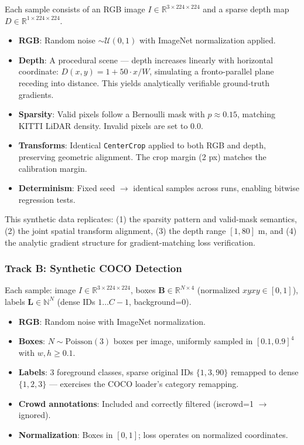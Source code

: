 \documentclass[10pt,conference]{IEEEtran}
\begin{document}
Each sample consists of an RGB image $I \in \mathbb{R}^{3 \times 224 \times 224}$ and a sparse depth map $D \in \mathbb{R}^{1 \times 224 \times 224}$.

\begin{itemize}
    \item \textbf{RGB}: Random noise $\sim \mathcal{U}(0,1)$ with ImageNet normalization applied.
    \item \textbf{Depth}: A procedural scene — depth increases linearly with horizontal coordinate: $D(x,y) = 1 + 50 \cdot x / W$, simulating a fronto-parallel plane receding into distance. This yields analytically verifiable ground-truth gradients.
    \item \textbf{Sparsity}: Valid pixels follow a Bernoulli mask with $p \approx 0.15$, matching KITTI LiDAR density. Invalid pixels are set to 0.0.
    \item \textbf{Transforms}: Identical \texttt{CenterCrop} applied to both RGB and depth, preserving geometric alignment. The crop margin (2 px) matches the calibration margin.
    \item \textbf{Determinism}: Fixed seed $\rightarrow$ identical samples across runs, enabling bitwise regression tests.
\end{itemize}

This synthetic data replicates: (1) the sparsity pattern and valid-mask semantics, (2) the joint spatial transform alignment, (3) the depth range $[1, 80]$ m, and (4) the analytic gradient structure for gradient-matching loss verification.

\subsubsection{Track B: Synthetic COCO Detection}
\label{sec:synth_coco}

Each sample: image $I \in \mathbb{R}^{3 \times 224 \times 224}$, boxes $\mathbf{B} \in \mathbb{R}^{N \times 4}$ (normalized $xyxy \in [0,1]$), labels $\mathbf{L} \in \mathbb{N}^N$ (dense IDs $1 \dots C-1$, background=0).

\begin{itemize}
    \item \textbf{RGB}: Random noise with ImageNet normalization.
    \item \textbf{Boxes}: $N \sim \text{Poisson}(3)$ boxes per image, uniformly sampled in $[0.1, 0.9]^4$ with $w,h \ge 0.1$.
    \item \textbf{Labels}: 3 foreground classes, sparse original IDs $\{1, 3, 90\}$ remapped to dense $\{1, 2, 3\}$ — exercises the COCO loader's category remapping.
    \item \textbf{Crowd annotations}: Included and correctly filtered (iscrowd=1 $\rightarrow$ ignored).
    \item \textbf{Normalization}: Boxes in $[0,1]$; loss operates on normalized coordinates.
\end{itemize}
\end{document}

